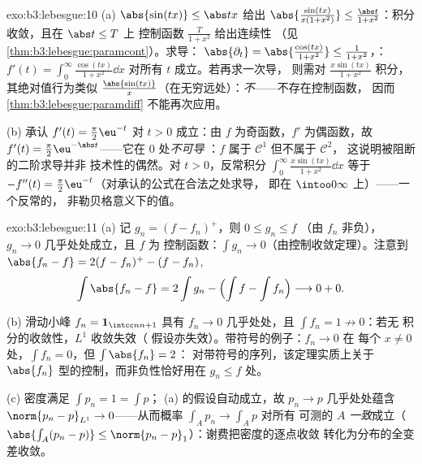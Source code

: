 \begin{solution}{exo:b3:lebesgue:10}
(a) $\abs{\sin(tx)} \leq \abs tx$ 给出
$\abs{\frac{\sin(tx)}{x(1+x^2)}} \leq \frac{\abs
t}{1+x^2}$：积分收敛，且在 $\abs t \leq T$ 上
控制函数 $\frac{T}{1+x^2}$ 给出连续性
（见\cref{thm:b3:lebesgue:paramcont}）。求导：
$\abs{\partial_t} = \abs{\frac{\cos(tx)}{1+x^2}} \leq
\frac1{1+x^2}$，：$f'(t) =
\int_0^\infty\frac{\cos(tx)}{1+x^2}\dd x$ 对所有 $t$ 成立。若再求一次导，
则需对 $\frac{x\sin(tx)}{1 +
x^2}$ 积分，其绝对值行为类似 $\frac{\abs{\sin(tx)}}
x$（在无穷远处）：\emph{不}——不存在控制函数，
因而 \cref{thm:b3:lebesgue:paramdiff} 不能再次应用。

(b) 承认 $f'(t) = \frac\pi2\eu^{-t}$ 对 $t > 0$ 成立：由
$f$ 为奇函数，$f'$ 为偶函数，故 $f'(t) =
\frac\pi2\eu^{-\abs t}$——它在 $0$ 处\emph{不可导
}：$f$ 属于 $\mathcal C^1$ 但不属于 $\mathcal C^2$，
这说明被阻断的二阶求导并非
技术性的偶然。对 $t > 0$，反常积分
$\int_0^\infty\frac{x\sin(tx)}{1+x^2}\dd x$ 等于 $-f''(t) =
\frac\pi2\eu^{-t}$（对承认的公式在合法之处求导，
即在 $\intoo0\infty$ 上）——一个反常的，
非勒贝格意义下的值。
\end{solution}

\begin{solution}{exo:b3:lebesgue:11}
(a) 记 $g_n = (f - f_n)^+$，则 $0 \leq g_n \leq f$
（由 $f_n$ 非负），$g_n \to 0$ 几乎处处成立，且 $f$ 为
控制函数：$\int g_n \to 0$（由控制收敛定理）。注意到
$\abs{f_n - f} = 2(f - f_n)^+ - (f - f_n)$,
\[
\int\abs{f_n - f} = 2\int g_n - \Bigl(\int f - \int
f_n\Bigr) \longrightarrow 0 + 0 .
\]

(b) 滑动小峰 $f_n = \mathbf 1_{\intcc n{n+1}}$ 具有
$f_n \to 0$ 几乎处处，且 $\int f_n = 1 \not\to 0$：若无
积分的收敛性，$L^1$ 收敛失效（
假设亦失效）。带符号的例子：$f_n \to 0$ 在
每个 $x \neq 0$ 处，$\int f_n = 0$，但 $\int\abs{f_n} = 2$：
对带符号的序列，该定理实质上关于
$\abs{f_n}$ 型的控制，而非负性恰好用在
$g_n \leq f$ 处。

(c) 密度满足 $\int p_n = 1 = \int p$；
(a) 的假设自动成立，故 $p_n \to p$ 几乎处处蕴含
$\norm{p_n - p}_{L^1} \to 0$——从而概率
$\int_Ap_n \to \int_Ap$ 对所有
可测的 $A$ \emph{一致}成立（$\abs{\int_A(p_n - p)} \leq
\norm{p_n - p}_1$）：谢费把密度的逐点收敛
转化为分布的全变差收敛。
\end{solution}

